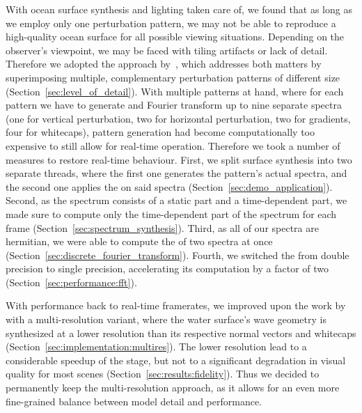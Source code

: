 With ocean surface synthesis and lighting taken care of, we found that
as long as we employ only one perturbation pattern, we may not
be able to reproduce a high-quality ocean surface for all possible
viewing situations. Depending on the observer's viewpoint, we may be
faced with tiling artifacts or lack of detail.
Therefore we adopted the approach by~\citet{misc:oceanlightingfft},
which addresses both matters by superimposing multiple, complementary perturbation
patterns of different size (Section~\ref{sec:level_of_detail}).
With multiple patterns at hand, where for each pattern we have to
generate and Fourier transform up to nine separate spectra (one for vertical
perturbation, two for horizontal perturbation, two for gradients,
four for whitecaps), pattern generation had become computationally too
expensive to still allow for real-time operation.
Therefore we took a number of measures to restore real-time behaviour.
First, we split surface synthesis into two separate threads, where the first
one generates the pattern's actual spectra, and the second one
applies the \InvFourierTransform on said spectra (Section~\ref{sec:demo_application}).
Second, as the spectrum consists of a static part and a time-dependent part,
we made sure to compute only the time-dependent part of the spectrum for each
frame (Section~\ref{sec:spectrum_synthesis}).
Third, as all of our spectra are hermitian, we were able to compute the
\InvFourierTransform of two spectra at once (Section~\ref{sec:discrete_fourier_transform}).
Fourth, we switched the \InvFourierTransform from double precision to single
precision, accelerating its computation by a factor of two
(Section~\ref{sec:performance:fft}).

With performance back to real-time framerates, we improved upon the work by
\citet{misc:oceanlightingfft} with a multi-resolution variant, where
the water surface's wave geometry is synthesized at a lower resolution
than its respective normal vectors and whitecaps
(Section~\ref{sec:implementation:multires}).
The lower resolution lead to a considerable speedup of the \FourierTransform
stage, but not to a significant degradation in visual quality for most scenes
(Section~\ref{sec:results:fidelity}).
Thus we decided to permanently keep the multi-resolution approach, as it
allows for an even more fine-grained balance between model detail and performance.
%

